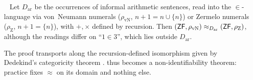 \begin{proposition}\ \label{prop:informal:benacerraf}
Let $D_{\mathrm{ar}}$ be the occurrences of informal arithmetic sentences, read into the $\in$-language via von~Neumann numerals ($\rho_{\mathrm{vN}}$, $n+1=n\cup\{n\}$) or Zermelo numerals ($\rho_{\mathrm Z}$, $n+1=\{n\}$), with $+,\times$ defined by recursion. Then $(\mathsf{ZF},\rho_{\mathrm{vN}})\approx_{D_{\mathrm{ar}}}(\mathsf{ZF},\rho_{\mathrm Z})$, although the readings differ on ``$1\in3$'', which lies outside $D_{\mathrm{ar}}$.
\end{proposition}

The proof transports along the recursion-defined isomorphism given by Dedekind's categoricity theorem \citep{dedekind1888zahlen}.  thus becomes a non-identifiability theorem: practice fixes $\approx$ on its domain and nothing else.

